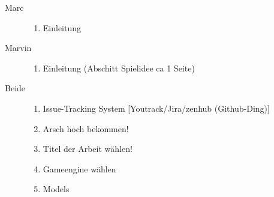 \begin{description}
	\item[Marc]{
		\begin{enumerate}
			\item{ Einleitung }
		\end{enumerate}
	}
	\item[Marvin]{
		\begin{enumerate}
			\item{ Einleitung (Abschitt Spielidee ca 1 Seite) }
		\end{enumerate}
	}
	\item[Beide]{
		\begin{enumerate}
			\item{Issue-Tracking System [Youtrack/Jira/zenhub (Github-Ding)]}
			\item{Arsch hoch bekommen!}
			\item{Titel der Arbeit wählen!}
			\item{Gameengine wählen}
			\item{Models}
		\end{enumerate}
	}
\end{description}
